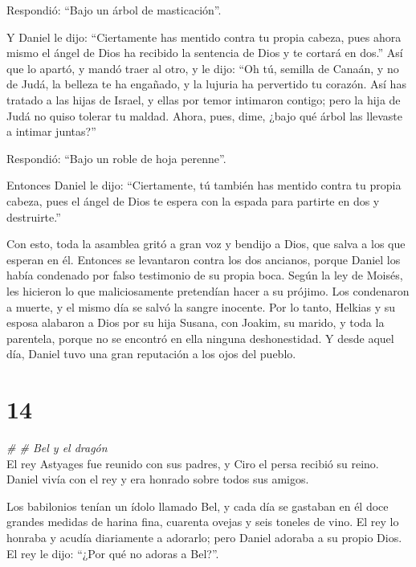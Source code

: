 Respondió: ``Bajo un árbol de masticación''.

 Y Daniel le dijo: ``Ciertamente has mentido contra tu
propia cabeza, pues ahora mismo el ángel de Dios ha recibido la
sentencia de Dios y te cortará en dos.''  Así que lo
apartó, y mandó traer al otro, y le dijo: ``Oh tú, semilla de Canaán, y
no de Judá, la belleza te ha engañado, y la lujuria ha pervertido tu
corazón.  Así has tratado a las hijas de Israel, y ellas
por temor intimaron contigo; pero la hija de Judá no quiso tolerar tu
maldad.  Ahora, pues, dime, ¿bajo qué árbol las llevaste
a intimar juntas?''

Respondió: ``Bajo un roble de hoja perenne''.

 Entonces Daniel le dijo: ``Ciertamente, tú también has
mentido contra tu propia cabeza, pues el ángel de Dios te espera con la
espada para partirte en dos y destruirte.''

 Con esto, toda la asamblea gritó a gran voz y bendijo a
Dios, que salva a los que esperan en él.  Entonces se
levantaron contra los dos ancianos, porque Daniel los había condenado
por falso testimonio de su propia boca.  Según la ley de
Moisés, les hicieron lo que maliciosamente pretendían hacer a su
prójimo. Los condenaron a muerte, y el mismo día se salvó la sangre
inocente.  Por lo tanto, Helkias y su esposa alabaron a
Dios por su hija Susana, con Joakim, su marido, y toda la parentela,
porque no se encontró en ella ninguna deshonestidad.  Y
desde aquel día, Daniel tuvo una gran reputación a los ojos del pueblo.

\hypertarget{section-13}{%
\section{14}\label{section-13}}

\emph{\# \# Bel y el dragón}\\

 El rey Astyages fue reunido con sus padres, y Ciro el
persa recibió su reino.  Daniel vivía con el rey y era
honrado sobre todos sus amigos.

 Los babilonios tenían un ídolo llamado Bel, y cada día se
gastaban en él doce grandes medidas de harina fina, cuarenta ovejas y
seis toneles de vino.  El rey lo honraba y acudía
diariamente a adorarlo; pero Daniel adoraba a su propio Dios. El rey le
dijo: ``¿Por qué no adoras a Bel?''.

